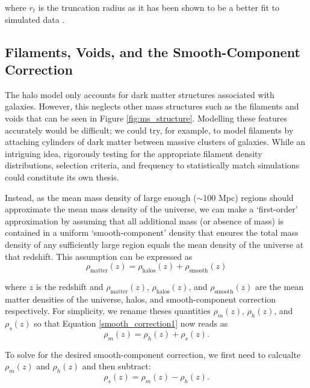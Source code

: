 \documentclass[%
 reprint,
 amsmath,amssymb,
 aps,nofootinbib
]{revtex4-1}
\begin{document}
\noindent where $r_t$ is the truncation radius as it has been shown to be a better fit to simulated data \cite{nfw_bmo}.


\subsection{Filaments, Voids, and the Smooth-Component Correction} \label{scc}

The halo model only accounts for dark matter structures associated with galaxies. However, this neglects other mass structures such as the filaments and voids that can be seen in Figure \ref{fig:ms_structure}. Modelling these features accurately would be difficult; we could try, for example, to model filaments by attaching cylinders of dark matter between massive clusters of galaxies. While an intriguing idea, rigorously testing for the appropriate filament density distributions, selection criteria, and frequency to statistically match simulations could constitute its own thesis.

Instead, as the mean mass density of large enough ($\sim$100 Mpc) regions should approximate the mean mass density of the universe, we can make a `first-order' approximation by assuming that all additional mass (or absence of mass) is contained in a uniform `smooth-component' density that ensures the total mass density of any sufficiently large region equals the mean density of the universe at that redshift. This assumption can be expressed as
\begin{equation}\label{smooth_correction1}
\rho_{\text{matter}}(z)=\rho_{\text{halos}}(z)+\rho_{\text{smooth}}(z)
\end{equation}

\noindent where $z$ is the redshift and $\rho_{\text{matter}}(z)$, $\rho_{\text{halos}}(z)$, and $\rho_{\text{smooth}}(z)$ are the mean matter densities of the universe, halos, and smooth-component correction respectively. For simplicity, we rename theses quantities ${\rho_m(z)}$, ${\rho_h(z)}$, and ${\rho_s(z)}$ so that Equation \eqref{smooth_correction1} now reads as
\begin{equation}\label{smooth_correction2}
\rho_m(z)=\rho_h(z)+\rho_s(z).
\end{equation}

To solve for the desired smooth-component correction, we first need to calcualte ${\rho_m(z)}$ and ${\rho_h(z)}$ and then subtract:
\begin{equation}\label{smooth_correction2}
\rho_s(z)=\rho_m(z)-\rho_h(z).
\end{equation}
\end{document}
